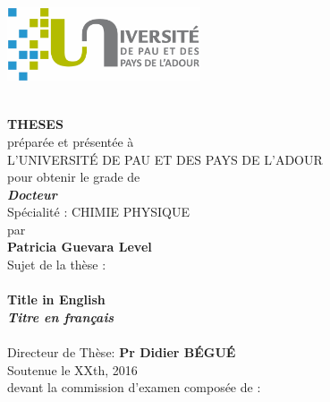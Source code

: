\documentclass[12pt,a4paper]{book}
\begin{document}
\thispagestyle{empty}
\begin{center}
\includegraphics[height=2.2cm]{logo/uppa.png}
\end{center}
\begin{center}
	\hbox{}\setlength{\baselineskip}{13pt}~\\
	{\Large{\textbf{THESES}}}\\[\baselineskip]
	préparée et présentée à \\[\baselineskip]
	L'UNIVERSIT\'E DE PAU ET DES PAYS DE L'ADOUR \\[\baselineskip]
	pour obtenir le grade de\\[\baselineskip]
		{\Large\textit{{\textbf{Docteur}}}}\\[\baselineskip]
	Spécialité : CHIMIE PHYSIQUE \\[\baselineskip]
	par\\[\baselineskip]
  	\baselineskip=20pt
	{\LARGE{\textbf{Patricia Guevara Level}}}\\
	Sujet de la thèse :\\
	\hbox{}
	\setlength{\baselineskip}{4pt}
	\hbox{}\setlength{\baselineskip}{10pt}~\\
	\vspace*{-5pt}
	{\Large\textbf{Title in English \\ \textit{Titre en français}}}~\\[\baselineskip]
	\hbox{}~\\
	
	Directeur de Thèse: \textbf{Pr Didier B\'EGU\'E}\\[\baselineskip]
	Soutenue le  XXth, 2016\\[\baselineskip]
	devant la commission d'examen composée de :\\[\baselineskip]~\\[\baselineskip] 
	
	\JURY
\end{center}
\end{document}
